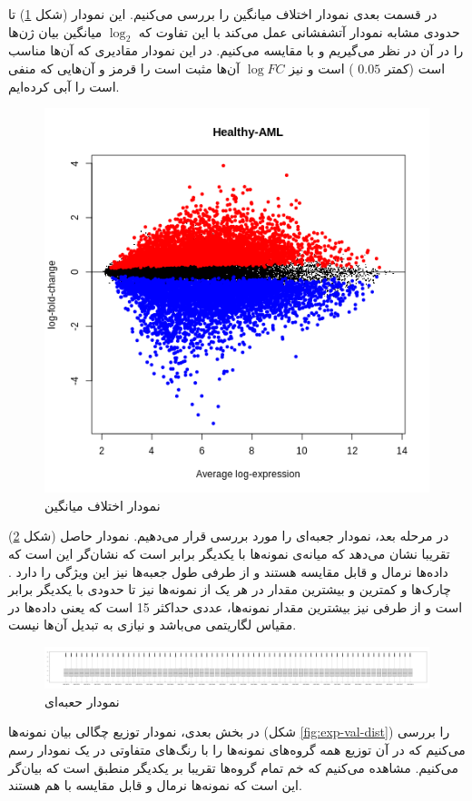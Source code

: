 \documentclass{article}
\begin{document}
در قسمت بعدی نمودار اختلاف میانگین
را بررسی می‌کنیم. این نمودار (شکل \ref{fig:md}) تا حدودی مشابه نمودار آتشفشانی عمل می‌کند با این تفاوت که 
$\log_2$
میانگین بیان ژن‌ها را در آن در نظر می‌گیریم و با 
مقایسه می‌کنیم. در این نمودار  مقادیری  که 
آن‌ها مناسب است (کمتر 
$0.05$
)
است و نیز 
$\log FC$
آن‌ها مثبت است را قرمز و آن‌هایی که منفی است را آبی کرده‌ایم.

\begin{figure}[h!]
	\centering
	\includegraphics[width=0.5\columnwidth]{figs/md.png}
	\caption{نمودار اختلاف میانگین}
	\label{fig:md}
\end{figure}

در مرحله بعد، نمودار جعبه‌ای را مورد بررسی قرار می‌دهیم. نمودار حاصل (شکل \ref{fig:boxplot}) تقریبا نشان می‌دهد که میانه‌ی نمونه‌ها با یکدیگر برابر است که نشان‌گر این است که داده‌ها نرمال و قابل مقایسه هستند و از طرفی طول جعبه‌ها نیز این ویژگی را دارد . چارک‌ها و کمترین و بیشترین مقدار در هر یک از نمونه‌‌ها نیز تا حدودی با یکدیگر برابر است و از طرفی نیز بیشترین مقدار نمونه‌ها، عددی حداکثر 15 است که یعنی داده‌ها در مقیاس لگاریتمی می‌باشد و نیازی به تبدیل آن‌ها نیست.

\begin{figure}[h!]
	\centering
	\includegraphics[width=0.8\columnwidth]{figs/boxplot.pdf}
	\caption{نمودار حعبه‌ای}
	\label{fig:boxplot}
\end{figure}

در بخش بعدی، نمودار توزیع چگالی بیان نمونه‌ها (شکل \ref{fig:exp-val-dist}) را بررسی می‌کنیم که در آن توزیع همه گروه‌های نمونه‌ها را با رنگ‌های متفاوتی در یک نمودار رسم می‌کنیم. مشاهده می‌کنیم که خم تمام گروه‌ها تقریبا بر یکدیگر منطبق است که بیان‌گر این است که نمونه‌ها نرمال و قابل مقایسه با هم هستند.
\end{document}
